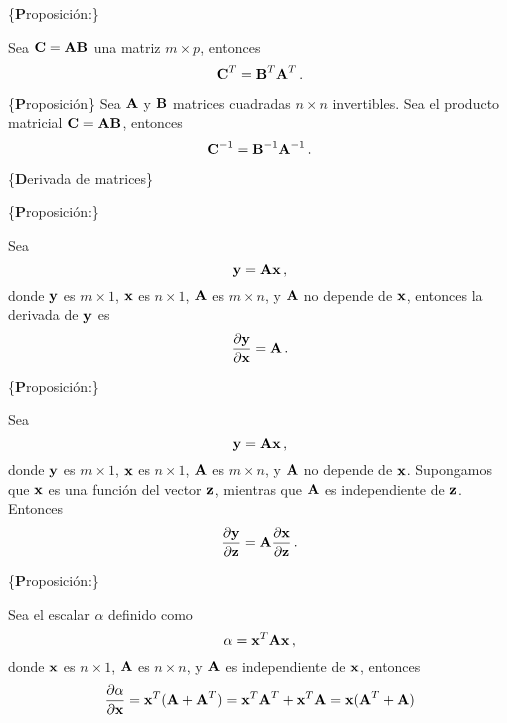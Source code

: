 \documentclass[
]{agujournal2019}
\begin{document}
\vspace{0.5cm}

\{\noindent \textbf Proposición:\}

\noindent Sea \({\textbf C}={\textbf A}{\textbf B}\) una matriz
\(m\times p\), entonces \[{\textbf C}^T={\textbf B}^T {\textbf A}^T\,.\]

\vspace{0.5cm}

\{\noindent \textbf Proposición\} Sea \({\textbf A}\) y \({\textbf B}\)
matrices cuadradas \(n\times n\) invertibles. \noindent Sea el producto
matricial \({\textbf C}={\textbf A}{\textbf B}\), entonces
\[{\textbf C}^{-1}={\textbf B}^{-1} {\textbf A}^{-1}\,.\]

\vspace{0.5cm}

\{\noindent \textbf Derivada de matrices\}

\vspace{0.5cm}

\{\noindent \textbf Proposición:\}

\noindent Sea \[{\textbf y}={\textbf A}{\textbf x}\,,\] donde
\({\textbf y}\) es \(m\times 1\), \({\textbf x}\) es \(n\times 1\),
\({\textbf A}\) es \(m\times n\), y \({\textbf A}\) no depende de
\({\textbf x}\), entonces la derivada de \({\textbf y}\) es
\[\frac{\partial{\textbf y}}{\partial{\textbf x}}={\textbf A}\,.\]

\vspace{0.5cm}

\{\noindent \textbf Proposición:\}

Sea \[{\textbf y}={\textbf A}{\textbf x}\,,\] donde \({\textbf y}\) es
\(m\times 1\), \({\textbf x}\) es \(n\times 1\), \({\textbf A}\) es
\(m\times n\), y \({\textbf A}\) no depende de \({\textbf x}\).
Supongamos que \({\textbf x}\) es una función del vector
\({\textbf z}\), mientras que \({\textbf A}\) es independiente de
\({\textbf z}\). Entonces
\[\frac{\partial{\textbf y}}{\partial{\textbf z}}={\textbf A}\frac{\partial{\textbf x}}{\partial{\textbf z}}\,.\]

\vspace{0.5cm}

\{\noindent \textbf Proposición:\}

\noindent Sea el escalar \(\alpha\) definido como
\[\alpha={\textbf x}^T{\textbf A}{\textbf x}\,,\] donde \({\textbf x}\)
es \(n\times 1\), \({\textbf A}\) es \(n\times n\), y \({\textbf A}\) es
independiente de \({\textbf x}\), entonces
\[\frac{\partial{\alpha}}{\partial{{\textbf x}}}={\textbf x}^T({\textbf A}+{\textbf A}^T)={\textbf x}^T{\textbf A}^T + {\textbf x}^T{\textbf A}={\textbf x}({\textbf A}^T+{\textbf A})\]
\end{document}
